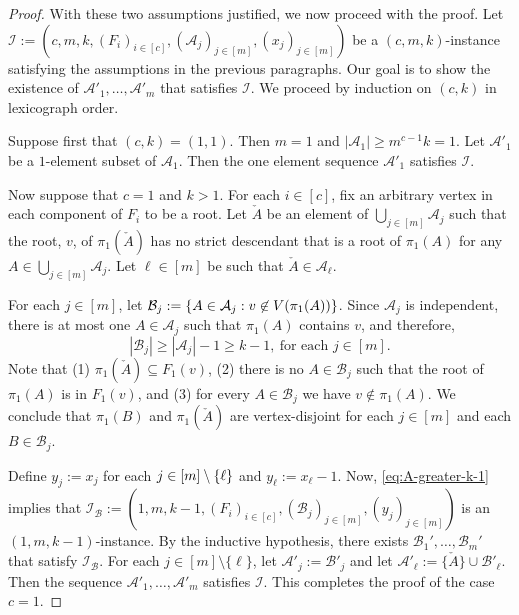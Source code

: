 \documentclass{patmorin}
\DeclarePairedDelimiter\set{\{}{\}}
\renewcommand{\mid}{:}  %
\begin{document}
\begin{proof}
With these two assumptions justified, we now proceed with the proof.  Let $\mathcal{I}:=(c,m,k,(F_i)_{i\in[c]},(\mathcal{A}_j)_{j\in[m]},(x_j)_{j\in[m]})$ be a $(c,m,k)$-instance satisfying the assumptions in the previous paragraphs.  Our goal is to show the existence of $\mathcal{A}'_1,\ldots,\mathcal{A}'_m$ that satisfies $\mathcal{I}$.  We proceed by induction on $(c,k)$ in lexicograph order.

Suppose first that $(c,k)=(1,1)$. Then $m=1$ and $|\mathcal{A}_1|\ge m^{c-1} k=1$.  Let $\mathcal{A}'_1$ be a $1$-element subset of $\mathcal{A}_1$.  Then the one element sequence $\mathcal{A}'_1$ satisfies $\mathcal{I}$.


Now suppose that $c=1$ and $k>1$.
For each $i\in[c]$, fix an arbitrary vertex in each component of $F_i$ to be a root.
Let $\check{A}$ be an element of $\bigcup_{j\in[m]}\mathcal{A}_j$ such that the root, $v$, of $\pi_1(\check{A})$ has no strict descendant that is a root of $\pi_1(A)$ for any $A\in\bigcup_{j\in[m]}\mathcal{A}_j$.
Let $\ell\in[m]$ be such that $\check{A}\in\mathcal{A}_{\ell}$.

For each $j\in[m]$,
let $\mathcal{B}_j:=\set{A\in\mathcal{A}_j\mid v\not\in V(\pi_1(A))}$.
Since $\mathcal{A}_j$ is independent, there is at most one $A\in\mathcal{A}_j$ such that $\pi_1(A)$ contains $v$,
and therefore,
\begin{equation}
|\mathcal{B}_j|\geq |\mathcal{A}_j|-1\geq k-1,\ \textrm{for each $j\in[m]$}.
\label{eq:A-greater-k-1}
\end{equation}
Note that
(1) $\pi_1(\check{A})\subseteq F_1(v)$,
(2) there is no $A\in\mathcal{B}_j$ such that the root of $\pi_1(A)$ is in $F_1(v)$, and
(3) for every $A\in\mathcal{B}_j$ we have $v\notin\pi_1(A)$.
We conclude that $\pi_1(B)$ and $\pi_1(\check{A})$ are vertex-disjoint for each $j\in[m]$ and each $B\in\mathcal{B}_j$.

Define
$y_j:=x_j$ for each $j\in[m]\setminus\set{\ell}$ and $y_\ell:=x_{\ell}-1$.
Now, \eqref{eq:A-greater-k-1} implies that
$\mathcal{I}_\mathcal{B}:=(1,m,k-1,(F_i)_{i\in[c]},(\mathcal{B}_j)_{j\in[m]},(y_j)_{j\in[m]})$ is an $(1,m,k-1)$-instance.  By the inductive hypothesis, there exists $\mathcal{B}_1',\ldots,\mathcal{B}_m'$ that satisfy $\mathcal{I}_\mathcal{B}$.
For each $j\in[m]\setminus\{\ell\}$, let $\mathcal{A}'_j:=\mathcal{B}'_j$ and let $\mathcal{A}'_\ell:= \{\check{A}\} \cup \mathcal{B}'_\ell$.
Then the sequence $\mathcal{A}'_1,\ldots,\mathcal{A}'_m$ satisfies $\mathcal{I}$.
This completes the proof of the case $c=1$.


\end{proof}
\end{document}

